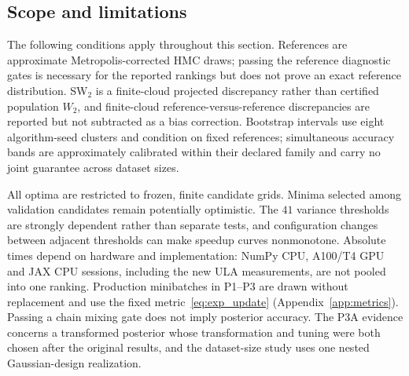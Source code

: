 \subsection{Scope and limitations}\label{sec:exp_limitations}
The following conditions apply throughout this section. References are approximate Metropolis-corrected HMC draws; passing the reference diagnostic gates is necessary for the reported rankings but does not prove an exact reference distribution. SW$_2$ is a finite-cloud projected discrepancy rather than certified population $W_2$, and finite-cloud reference-versus-reference discrepancies are reported but not subtracted as a bias correction. Bootstrap intervals use eight algorithm-seed clusters and condition on fixed references; simultaneous accuracy bands are approximately calibrated within their declared family and carry no joint guarantee across dataset sizes.

All optima are restricted to frozen, finite candidate grids. Minima selected among validation candidates remain potentially optimistic. The $41$ variance thresholds are strongly dependent rather than separate tests, and configuration changes between adjacent thresholds can make speedup curves nonmonotone. Absolute times depend on hardware and implementation: NumPy CPU, A100/T4 GPU and JAX CPU sessions, including the new ULA measurements, are not pooled into one ranking. Production minibatches in P1--P3 are drawn without replacement and use the fixed metric~\eqref{eq:exp_update} (Appendix~\ref{app:metrics}). Passing a chain mixing gate does not imply posterior accuracy. The P3A evidence concerns a transformed posterior whose transformation and tuning were both chosen after the original results, and the dataset-size study uses one nested Gaussian-design realization.

